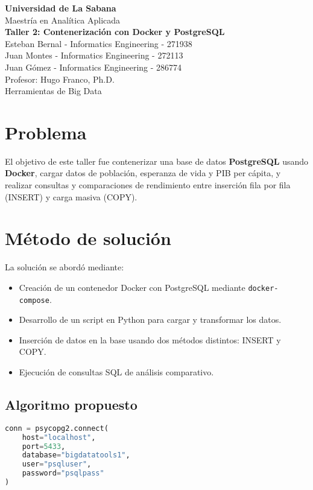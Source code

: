 \documentclass[12pt]{article}
\begin{document}
\begin{center}
    {\Large \textbf{Universidad de La Sabana}}\\
    \vspace{0.2cm}
    {\large Maestría en Analítica Aplicada}\\
    \vspace{3cm}
    {\LARGE \textbf{Taller 2: Contenerización con Docker y PostgreSQL}}\\
    \vspace{3cm}
    Esteban Bernal - Informatics Engineering - 271938\\
    Juan Montes - Informatics Engineering - 272113\\
    Juan Gómez - Informatics Engineering - 286774\\
    \vfill
    Profesor: Hugo Franco, Ph.D. \\
    Herramientas de Big Data \\
    \vspace{1cm}
\end{center}

\newpage

\section{Problema}
El objetivo de este taller fue contenerizar una base de datos \textbf{PostgreSQL} usando \textbf{Docker}, cargar datos de población, esperanza de vida y PIB per cápita, y realizar consultas y comparaciones de rendimiento entre inserción fila por fila (INSERT) y carga masiva (COPY).

\section{Método de solución}
La solución se abordó mediante:
\begin{itemize}
    \item Creación de un contenedor Docker con PostgreSQL mediante \texttt{docker-compose}.
    \item Desarrollo de un script en Python para cargar y transformar los datos.
    \item Inserción de datos en la base usando dos métodos distintos: INSERT y COPY.
    \item Ejecución de consultas SQL de análisis comparativo.
\end{itemize}

\subsection{Algoritmo propuesto}
\begin{lstlisting}[language=Python, caption=Fragmento del código en Python]
conn = psycopg2.connect(
    host="localhost",
    port=5433,
    database="bigdatatools1",
    user="psqluser",
    password="psqlpass"
)
\end{lstlisting}
\end{document}
